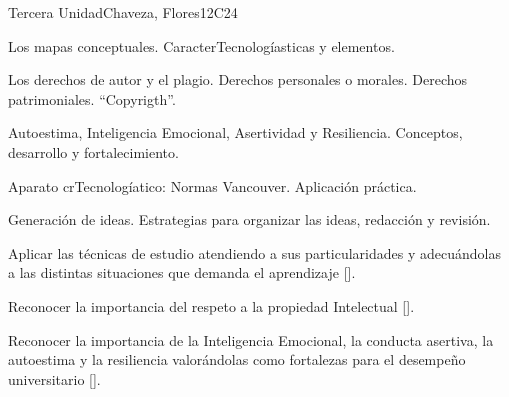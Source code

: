 \begin{syllabus}
\begin{unit}{}{Tercera Unidad}{Chaveza, Flores}{12}{C24}
\begin{topics}
        \item Los mapas conceptuales. CaracterTecnologíasticas y elementos.
        \item Los derechos de autor y el plagio. Derechos personales o morales. Derechos patrimoniales. ``Copyrigth''.
        \item Autoestima, Inteligencia Emocional, Asertividad y Resiliencia. Conceptos, desarrollo y fortalecimiento.
        \item Aparato crTecnologíatico: Normas Vancouver. Aplicación práctica.
        \item Generación de ideas. Estrategias para organizar las ideas, redacción y revisión.
\end{topics}
\begin{learningoutcomes}
        \item Aplicar las técnicas de estudio atendiendo a sus particularidades y adecuándolas a las distintas situaciones que demanda el aprendizaje [\Usage].
        \item Reconocer la importancia del respeto a la propiedad Intelectual [\Usage].
        \item Reconocer la importancia de la Inteligencia Emocional, la conducta asertiva, la autoestima y la resiliencia valorándolas como fortalezas para el desempeño universitario [\Usage].
\end{learningoutcomes}
\end{unit}


\end{syllabus}

